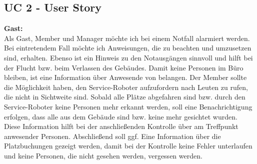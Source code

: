 	

\subsection*{UC 2 - User Story}
\textbf{Gast:}
\\
    Als Gast, Member und Manager möchte ich bei einem Notfall alarmiert werden. Bei eintretendem Fall möchte ich 
    Anweisungen, die zu beachten und umzusetzen sind, erhalten. Ebenso ist ein Hinweis zu den Notausgängen 
    sinnvoll und hilft bei der Flucht bzw. beim Verlassen des Gebäudes. Damit keine Personen im Büro 
    bleiben, ist eine Information über Anwesende von belangen. Der Member sollte die Möglichkeit haben, den 
    Service-Roboter aufzufordern nach Leuten zu rufen, die nicht in Sichtweite sind. Sobald alle Plätze 
    abgefahren sind bzw. durch den Service-Roboter keine Personen mehr erkannt werden, soll eine Benachrichtigung 
    erfolgen, dass alle aus dem Gebäude sind bzw. keine mehr gesichtet wurden. Diese Information hilft bei der 
    anschließenden Kontrolle über am Treffpunkt anwesender Personen. Abschließend soll ggf. Eine Information über die 
    Platzbuchungen gezeigt werden, damit bei der Kontrolle keine Fehler unterlaufen und keine Personen, die nicht 
    gesehen werden, vergessen werden.

